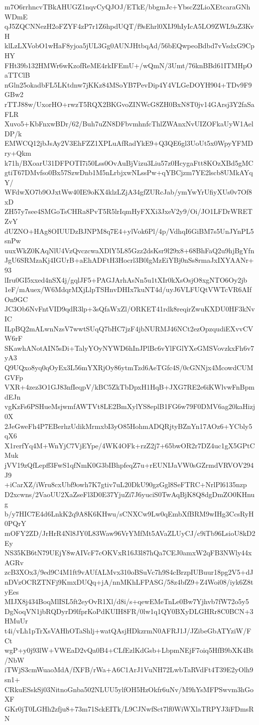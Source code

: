 m7O6rrhncvTBkAHUGZ1nqvCyQJOJ/ETkE/bbgmJc+YbscZ2LioXEtcaraGNhWDmE
qJ5ZQCNNezH2oFZYF4zP7r1Z6hpdUQT/f9sEhrl0XIJ9hIyIcA5LO9ZWL9aZ3KvH
klLzLXVobO1wHaF8yjoa5jUL3Gg0AUNJHtbqAd/56bEQwpeoBdbd7vVsdxG9CpHY
FHt39b132HMWr6wKzofReME4rkIFEmU+/wQmN/3Umt/76knBBd61ITMHpOaTTClB
nGln25okadbFL5LKtdnw7jKKz84MSoYB7PevDip4Y4VLGeDOYH904+TDv9F9GBw2
rTTJ88w/UxorHO+rwzT5RQX2BKGvoZINWcG8ZH0BxN8T0jv14GArsj3Y2faSaFLR
Xuvo5+KbFnxwBDr/62/Buh7uZN8DFbvmhnfcThlZWAnxNvUIZOFkaUyW1AelDP/k
EMWCQ12jbJsAy2V3EhFZZ1XPLuAfRadYkE9+Q3QE6gl3UoUt5x0WpyYFMDry+Qkm
k71h/BXoarU31DFPOTI7i50Lss0OvAuBjVizu3Liu57z0HcygaFtt8KOzXBd5gMC
gtiT67DMvfso0Bx57SzwDnb1M5nLrbjxwNLssPw+qYBCjzm7YE2lscb8UMkAYqY/
WFdwXO7b9OJxtWw40IE9oKX4klzLZjA34gfZURcJab/ymYwYrUfiyXUs0v7Of8xD
ZH57y7see4SMGoTsCHRa8PvT5R5lrIqmHyFXXi3JxeV2y9/Oi/JO1LFDrWRETZvY
dUZNO+HAg8OIUUDzBJNPM8q7E4+ylVok6Pl/4p/VdhqI6GiBM7s5UnJYnPL5snPw
uuxWkZ0KAqNlU4VzQvczcwaXDlY5L85Gzz2dsKsr9l29x8+68BhFaQ2u9hjBgYfn
JgU6SRMzaKj4IGUrB+aEhADFtH3Hocrl3B0lgMzEiYBj0nSs8rmaJxIXYAANr+93
lIru0GI5xxed4nSX4j/gqlJF5+PAGJArhAsNn5u1tXIr0kXsOsjO8xgNTO6Oy2jb
1eF/mAuex/W6MdqrMXjLlpTSHnvDHIx7kuNT4d/uyJ6VLFUQtVWTcVR6AIfOn9GC
JC3Ob6NvFntVID9qdR3lp+3sQfaWxZl/ORKET41rdk8reqirZwuKXDU0HF3kNvIC
ILpBQ2mALwnNzsV7wwtSUqQ7bHC7jzF4jbNURMJ46NCt2ezOpzqudiEXvvCVW6rF
SKawhANotAIN5sDi+TalyYOyNYWD6hInJPlBc6vYlFGlYXeGMSVovzkxFh6v7yA3
Q9UQxo8yq0qOyEx3L56mYXRjOy86ytmTzd6AeTGfc4S/0cGNNjx4McowdCUMGVFp
VXR+4zez3O1GJ83nfIeqpV/kBC5ZkTbDpxH1HqB+JXG7RE2e6iKWlvwFnBpmdEJn
vgKzFs6PSHueMsjwmfAWTVt8LE2BmXylYS8eplB1FG6w79F0DMV6ag20kaHizj0X
2JeGweFh4P7EBerhzUdikMrmxbI3yO85HohmADQRjtyBZnYn17AOz6+YCbly5qX6
X1rerfYq4M+WnYjC7VjEYpe/4WK4OFk+rzZ2j7+65bwOR2r7DZ4uc1gX5GPtCMuk
jVV19zQfLepff3FwS1qfNmK0G3bIBhpfeqZ7u+rEUNIJaVW0sGZrmdVRVOV294J9
+iCarXZ/iWru8cxUbf9owh7K7gtiv7uL20DkU90gzGgl8SeFTRC+NrlPl6135nzp
D2xcwns/2VaoUU2XaZseFl3D0E37YjuZi7J6yuciS0TwAqBjK8Q8dgDmZO0KHnug
b/y7HIC7E4d6LnkK2q9A8K6KHwu/sCNXCw9Lw0qEmbXfBRM9wIHg3CcsRyH0PQrY
mOFY2ZD/JrHrR4Nl8JY0L83Waw96VrYMfMt5AVaZLUyCJ/c9iTb96LsioU8kD2Ey
NS35KB6tN79UEjY8wAIVcF7cOKVxR16J3l87hQa7CEJ0amxW2qFB3NWly44xAGRv
zcB3XOx3/9ed9C4M1ft9vAUfALMvx310oBSuVc7h9S4cBrzpIUBuur18pg2V5+dJ
nDVzOCRZTNFj9KmxDUQq+jA/nnMKhLFPASG/58z4bfZ9+Z4Woi08/iyk6Z8tyEes
MIJX8j434BoqMlISL5ft2eyOvR1Xl/d8i/s+qewEMeTnLe0Bw7Yjhvb7fW72o5y5
DgNoqVN1jbRQDyrD9lfprKoPdKUIH8FR/0lw1q1QY0BXyDLGHRr8C0BCN+3HMuUr
t4i/vLh1pTrXsVAHhOTaShlj+watQAsjHDkzrmN0AFRJ1J/JZibeGbATYziW/FCt
wgP+y0j93lW+VWEaD2vQa0B4+CLfEzlKdGsb+LbpmNEjF7oiq5HfB9bXK4Bt/NbW
iTWjS3cmWuaoMdA/fXFB/rWa+A6C1ArJ1VuNH72LwbTaRVdFt4T39E2yOlh9sn1+
CRkuESskSj03NitnoGnba502NLUU5ylfOH5HzOkfr6uNv/M9hYsMFPSwvm3hGoXF
GKr0jT0LGHh2zfju8+73m71SckEITk/L9CJNwfSct7lf0WiWXlaTRPYJ3iFDmsRN
